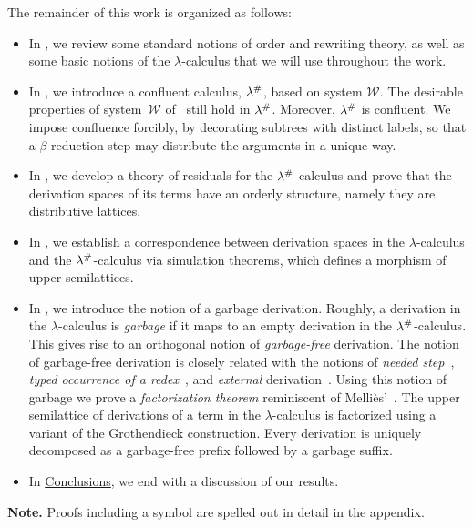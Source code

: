 The remainder of this work is organized as follows:
\begin{itemize}
\item
  In , we review some standard notions of order and rewriting theory, as well as some
  basic notions of the $\lambda$-calculus that we will use throughout the work.
\item
  In , we introduce a confluent calculus, $\lambda^{\mathtt{\#}}$,
  based on system $\mathcal{W}$.
  The desirable properties of system~$\mathcal{W}$ of~\cite{bucciarelli2017non} still hold in $\lambda^{\mathtt{\#}}$.
  Moreover, $\lambda^{\mathtt{\#}}$ is confluent.
  We impose confluence forcibly, by decorating subtrees with distinct labels, so that
  a $\beta$-reduction step may distribute the arguments in a unique way.
\item
  In , we develop a theory of residuals for the
  $\lambda^{\mathtt{\#}}$-calculus and prove that the derivation spaces of its terms
  have an orderly structure, namely they are distributive lattices.
\item
  In , we establish a correspondence between derivation spaces in the
  $\lambda$-calculus and the $\lambda^{\mathtt{\#}}$-calculus via simulation theorems,
  which defines a morphism of upper semilattices.
\item
  In , we introduce the notion of a garbage derivation.
  Roughly, a derivation in the $\lambda$-calculus is {\em garbage} if it maps to
  an empty derivation in the $\lambda^{\mathtt{\#}}$-calculus.
  This gives rise to an orthogonal notion of {\em garbage-free} derivation.
  The notion of garbage-free derivation is closely related
  with the notions of {\em needed step}~\cite[Section~8.6]{Terese},
  {\em typed occurrence of a redex}~\cite{bucciarelli2017non},
  and {\em external} derivation~\cite{DBLP:conf/ctcs/Mellies97}.
  Using this notion of garbage we prove a {\em factorization theorem}
  reminiscent of Melli\`es'~\cite{DBLP:conf/ctcs/Mellies97}.
  The upper semilattice of derivations of a term in the $\lambda$-calculus
  is factorized using a variant of the Grothendieck construction.
  Every derivation is uniquely decomposed as a garbage-free prefix followed by a garbage suffix.
\item
  In \hyperref[ch:conclusions]{Conclusions}, we end with a discussion of our results.
\end{itemize}
\bigskip
{\bf Note.} Proofs including a \SeeAppendix symbol are spelled out in detail in the appendix.
